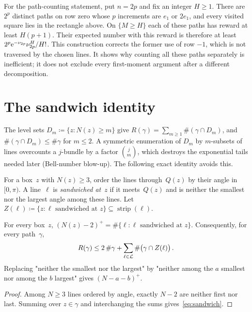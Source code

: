 \documentclass[11pt,letterpaper]{article}
\begin{document}
For the path-counting statement, put $n=2p$ and fix an integer $H\ge1$. There are $2^p$ distinct paths on row zero whose $p$ increments are $e_1$ or $2e_1$, and every visited square lies in the rectangle above. On $\{M\ge H\}$ each of these paths has reward at least $H(p+1)$. Their expected number with this reward is therefore at least $2^p\mathrm{e}^{-\nu_{2p}}\nu_{2p}^H/H!$. This construction corrects the former use of row $-1$, which is not traversed by the chosen lines. It shows why counting all these paths separately is inefficient; it does not exclude every first-moment argument after a different decomposition.

\section{The sandwich identity}
\label{sec:sandwich}

The level sets $D_m\coloneqq\{z\colon N(z)\ge m\}$ give $R(\gamma)=\sum_{m\ge1}\#(\gamma\cap D_m)$, and $\#(\gamma\cap D_m)\le\#\gamma$ for $m\le2$. A symmetric enumeration of $D_m$ by $m$-subsets of lines overcounts a $j$-bundle by a factor $\binom jm$, which destroys the exponential tails needed later (Bell-number blow-up). The following exact identity avoids this.

For a box~$z$ with $N(z)\ge3$, order the lines through~$Q(z)$ by their angle in~$[0,\pi)$. A line~$\ell$ is \emph{sandwiched at~$z$} if it meets~$Q(z)$ and is neither the smallest nor the largest angle among these lines. Let $Z(\ell)\coloneqq\{z\colon\ell\text{ sandwiched at }z\}\subseteq\operatorname{strip}(\ell)$.

\begin{lemma}
\label{lem:sandwich}
For every box~$z$, $(N(z)-2)^+=\#\{\ell\colon\ell\text{ sandwiched at }z\}$. Consequently, for every path~$\gamma$,
\begin{equation}
\label{eq:sandwich}
  R(\gamma)\le2\,\#\gamma+\sum_{\ell\in\mathcal L}\#\bigl(\gamma\cap Z(\ell)\bigr)\,.
\end{equation}
Replacing "neither the smallest nor the largest" by "neither among the $a$ smallest nor among the $b$ largest" gives $(N-a-b)^+$.
\end{lemma}

\begin{proof}
Among $N\ge3$ lines ordered by angle, exactly $N-2$ are neither first nor last. Summing over $z\in\gamma$ and interchanging the sums gives~\eqref{eq:sandwich}.
\end{proof}
\end{document}

